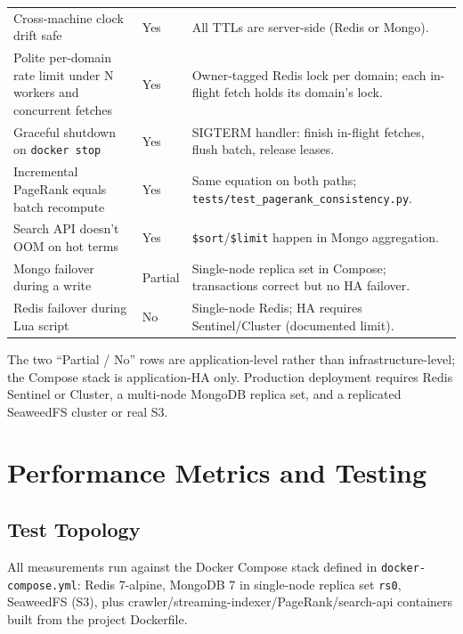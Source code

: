 \documentclass[11pt,a4paper]{article}
\newcommand{\code}[1]{\texttt{#1}}
\begin{document}
\begin{table}[H]
\begin{tabular}{p{}p{}p{}}
Cross-machine clock drift safe & Yes & All TTLs are server-side (Redis or Mongo).\\
Polite per-domain rate limit under N workers and concurrent fetches & Yes & Owner-tagged Redis lock per domain; each in-flight fetch holds its domain's lock.\\
Graceful shutdown on \code{docker stop} & Yes & SIGTERM handler: finish in-flight fetches, flush batch, release leases.\\
Incremental PageRank equals batch recompute & Yes & Same equation on both paths; \code{tests/test\_pagerank\_consistency.py}.\\
Search API doesn't OOM on hot terms & Yes & \code{\$sort}/\code{\$limit} happen in Mongo aggregation.\\
Mongo failover during a write & Partial & Single-node replica set in Compose; transactions correct but no HA failover.\\
Redis failover during Lua script & No & Single-node Redis; HA requires Sentinel/Cluster (documented limit).\\
\bottomrule
\end{tabular}
\normalsize
\end{table}

The two ``Partial / No'' rows are application-level rather than infrastructure-level; the Compose stack is application-HA only. Production deployment requires Redis Sentinel or Cluster, a multi-node MongoDB replica set, and a replicated SeaweedFS cluster or real S3.

\section{Performance Metrics and Testing}

\subsection{Test Topology}

All measurements run against the Docker Compose stack defined in \code{docker-compose.yml}: Redis 7-alpine, MongoDB 7 in single-node replica set \code{rs0}, SeaweedFS (S3), plus crawler/streaming-indexer/PageRank/search-api containers built from the project Dockerfile.
\end{document}
